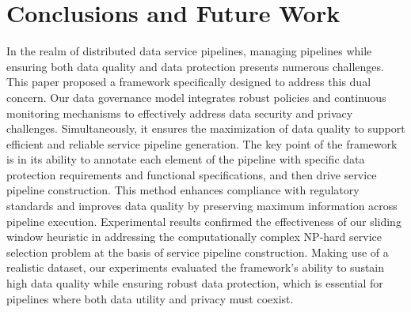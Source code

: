 \documentclass[sn-mathphys-num,referee]{sn-jnl}
\theoremstyle{definition}
\begin{document}












\section{Conclusions and Future Work}\label{sec:conclusions}
In the realm of distributed data service pipelines, managing pipelines while ensuring both data quality and data protection presents numerous challenges. This paper proposed a framework specifically designed to address this dual concern. %
Our data governance model integrates robust policies and continuous monitoring mechanisms to effectively address data security and privacy challenges. Simultaneously, it ensures the maximization of data quality to support efficient and reliable service pipeline generation. The key point of the framework is in its ability to annotate each element of the pipeline with specific data protection requirements and functional specifications, and then drive service pipeline construction. This method enhances compliance with regulatory standards and improves data quality by preserving maximum information across pipeline execution. Experimental results confirmed the effectiveness of our sliding window heuristic in addressing the computationally complex NP-hard service selection problem at the basis of service pipeline construction. Making use of a realistic dataset, our experiments evaluated the framework's ability to sustain high data quality while ensuring robust data protection, which is essential for pipelines where both data utility and privacy must coexist.
\end{document}

